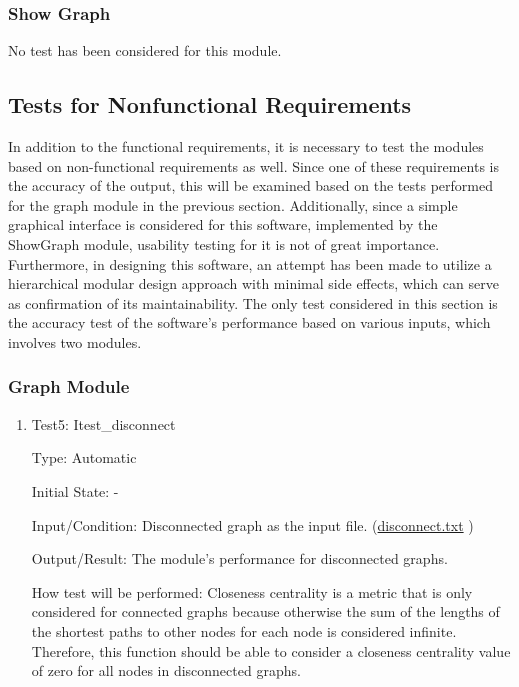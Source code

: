 \documentclass[12pt, titlepage]{article}
\begin{document}
\subsubsection{Show Graph}
No test has been considered for this module.

\subsection{Tests for Nonfunctional Requirements}

In addition to the functional requirements, it is necessary to test the modules based on non-functional requirements as well. Since one of these requirements is the accuracy of the output, this will be examined based on the tests performed for the graph module in the previous section. Additionally, since a simple graphical interface is considered for this software, implemented by the ShowGraph module, usability testing for it is not of great importance. Furthermore, in designing this software, an attempt has been made to utilize a hierarchical modular design approach with minimal side effects, which can serve as confirmation of its maintainability. The only test considered in this section is the accuracy test of the software's performance based on various inputs, which involves two modules.
		

\subsubsection{Graph Module}
\begin{enumerate}
\item{Test5: Itest\_disconnect\\}

Type: Automatic
					
Initial State: -
					
Input/Condition: Disconnected graph as the input file. (\href{https://github.com/AtiyehSayadi/Centrality-In-Graphs/tree/main/test/disconnect.txt}{disconnect.txt} )
					
Output/Result:  The module's performance for disconnected graphs.
					
How test will be performed: Closeness centrality is a metric that is only considered for connected graphs because otherwise the sum of the lengths of the shortest paths to other nodes for each node is considered infinite. Therefore, this function should be able to consider a closeness centrality value of zero for all nodes in disconnected graphs.
 \end{enumerate}
\end{document}
